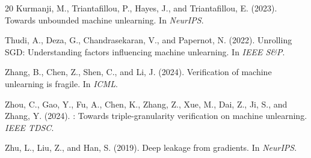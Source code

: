\documentclass{article}
\begin{document}
\begin{thebibliography}{20}
Kurmanji, M., Triantafillou, P., Hayes, J., and Triantafillou, E. (2023).
\newblock Towards unbounded machine unlearning.
\newblock In \emph{NeurIPS}.

Thudi, A., Deza, G., Chandrasekaran, V., and Papernot, N. (2022).
\newblock Unrolling {SGD}: Understanding factors influencing machine unlearning.
\newblock In \emph{IEEE S\&P}.

Zhang, B., Chen, Z., Shen, C., and Li, J. (2024).
\newblock Verification of machine unlearning is fragile.
\newblock In \emph{ICML}.

Zhou, C., Gao, Y., Fu, A., Chen, K., Zhang, Z., Xue, M., Dai, Z., Ji, S., and Zhang, Y. (2024).
: Towards triple-granularity verification on machine unlearning.
\newblock \emph{IEEE TDSC}.

Zhu, L., Liu, Z., and Han, S. (2019).
\newblock Deep leakage from gradients.
\newblock In \emph{NeurIPS}.

\end{thebibliography}
\end{document}
